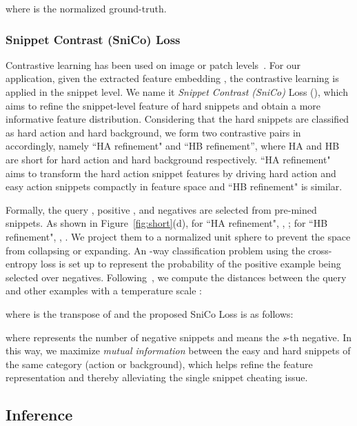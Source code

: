 \documentclass[final]{cvpr}
\begin{document}
where  is the normalized ground-truth.

\subsubsection{Snippet Contrast (SniCo) Loss}
Contrastive learning has been used on image or patch levels~\cite{bachman2019learning,henaff2019data}. For our application, given the extracted feature embedding , the contrastive learning is applied in the snippet level. We name it \textit{Snippet Contrast (SniCo)} Loss (), which  aims to refine the snippet-level feature of hard snippets and obtain a more informative feature distribution. Considering that the hard snippets are classified as hard action and hard background, we form two contrastive pairs in  accordingly, namely ``HA refinement" and ``HB refinement'', where HA and HB 
are short for hard action and hard background respectively. ``HA refinement" aims to transform the hard action snippet features by driving hard action and easy action snippets compactly in feature space and ``HB refinement" is similar. 

Formally, the query , positive , and  negatives  are selected from pre-mined snippets. As shown in Figure~\ref{fig:short}(d), for ``HA refinement", ,  ; for ``HB refinement", ,  . We project them to a normalized unit sphere to prevent the space from collapsing or expanding. An  -way classification problem using the cross-entropy loss is set up to represent the probability of the positive example being selected over negatives. Following~\cite{he2020momentum}, we compute the distances between the query and other examples with a temperature scale :

{\setlength\abovedisplayskip{1pt}
\setlength\belowdisplayskip{1pt}
}

\noindent where  is the transpose of  and the proposed SniCo Loss is as follows:



\noindent where  represents the number of negative snippets and  means the \textit{s}-th negative. In this way, we maximize \textit{mutual information} between the easy and hard snippets of the same category (action or background), which helps refine the feature representation and thereby alleviating the single snippet cheating issue.

\subsection{Inference} \label{subsec:infer}
\end{document}
